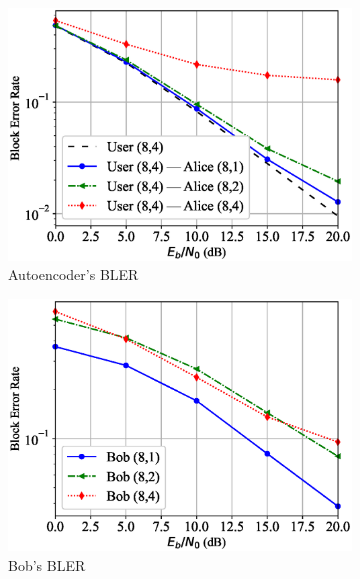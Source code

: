 \begin{figure}[tp!]
	\begin{subfigure}{0.28\textwidth}
		\includegraphics[width=\linewidth]{figs/covert_autoencoder_bler_rayleigh}
		\caption{Autoencoder's BLER}
		\label{fig:rayleigh_resutls_ae}
	\end{subfigure}
	\hspace*{\fill}
	\begin{subfigure}{0.28\textwidth}
		\includegraphics[width=\linewidth]{figs/bob_bler_rayleigh}
		\caption{Bob's BLER}
		\label{fig:rayleigh_resutls_bob}	
	\end{subfigure}
	\hspace*{\fill}
	\begin{subfigure}{0.28\textwidth}

\end{subfigure}
\end{figure}
